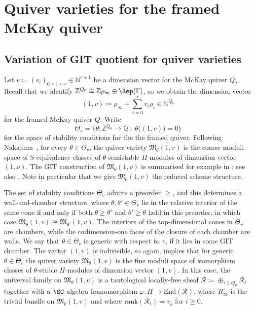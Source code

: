 \section{Quiver varieties for the framed McKay quiver}\label{sec:quivers}

\subsection{Variation of GIT quotient for quiver varieties}
\label{subsec:quivervars}

Let $v\coloneqq(v_i)_{0 \leq i \leq r} \in \mathbb{N}^{r+1}$ be a dimension vector for the McKay quiver $Q_\Gamma$.
Recall that we identify $\mathbb{Z}^{Q_0}\cong \mathbb{Z}\rho_{\infty}\oplus \Rep(\Gamma)$, so we obtain the
dimension vector \[(1,v) \coloneqq\rho_{\infty}+\sum_{i=0}^r v_i\rho_i \in \mathbb{N}^{Q_0}
\] for the framed McKay quiver $Q$. Write
\[ \Theta_{v}=\big\{\theta\colon \mathbb{Z}^{Q_0} \to \mathbb{Q}\; : \; \theta\big((1,v)\big)=0 \big\} \]
for the space of stability conditions for the
the framed quiver. Following Nakajima~\cite{nakajima1994instantons, Nakajima98}, for every $\theta \in \Theta_{v}$, the quiver variety $\mathfrak{M}_{\theta}(1,v)$ is the coarse moduli space of S-equivalence classes of $\theta$-semistable $\Pi$-modules of dimension vector $(1,v)$. The GIT construction of $\mathfrak{M}_{\theta}(1,v)$ is summarised for example in \cite[Section 2]{craw2019punctual}; see also \cite[Section 2]{nakajima2009quiver}. Note in particular that we give $\mathfrak{M}_{\theta}(1,v)$ the reduced scheme structure.


The set of stability conditions $\Theta_v$ admits a preorder $\geq$, and this determines a wall-and-chamber structure, where
$\theta,\theta' \in \Theta_v$ lie in the relative interior of the same cone if and only if both $\theta \geq \theta'$ and $\theta' \geq\theta$ hold in this preorder, in which case $\mathfrak{M}_{\theta}(1,v)\cong\mathfrak{M}_{\theta'}(1,v)$. The interiors of the top-dimensional cones in $\Theta_v$ are chambers, while the codimension-one faces of the closure of each chamber are walls. We say that $\theta \in \Theta_v$ is generic with respect to $v$, if it lies in some GIT chamber. The vector $(1,v)$ is indivisible, so again, \cite[Proposition~5.3]{king1994moduli} implies that for generic $\theta \in \Theta_v$ the quiver variety $\mathfrak{M}_{\theta}(1,v)$ is the fine moduli space of isomorphism classes of $\theta$-stable $\Pi$-modules of dimension vector $(1,v)$. In this case, the universal family on $\mathfrak{M}_{\theta}(1,v)$ is a tautological locally-free sheaf $\mathcal{R} \coloneqq \oplus_{i \in Q_0}\mathcal{R}_i$ together with a $\SC$-algebra homomorphism $\varphi \colon \Pi \to \mathrm{End}(\mathcal{R})$, where $R_\infty$ is the trivial bundle on $\mathfrak{M}_{\theta}(1,v)$ and where $\mathrm{rank}(\mathcal{R}_i) = v_j$ for $i \geq 0$.

